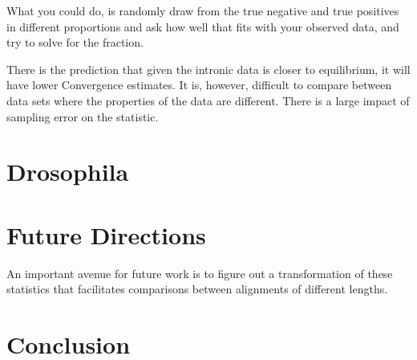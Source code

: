 What you could do, is randomly draw from the true negative and true positives in different proportions and ask how well that fits with your observed data, and try to solve for the fraction. 

There is the prediction that given the intronic data is closer to equilibrium, it will have  lower Convergence estimates. It is, however, difficult to compare between data sets where the properties of the data are different. There is a large impact of sampling error on the statistic. 



\section{Drosophila}

\section{Future Directions}
An important avenue for future work is to figure out a transformation of these statistics that facilitates comparisons between alignments of different lengths. 


\section{Conclusion}